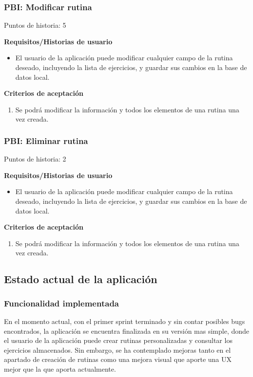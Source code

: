 \documentclass[11pt,a4paper]{report}
\begin{document}
\subsubsection{PBI: Modificar rutina}
Puntos de historia: 5	
\par\textbf{Requisitos/Historias de usuario}
\begin{itemize}
	\item El usuario de la aplicación puede modificar cualquier campo de la rutina deseado, incluyendo la lista de ejercicios, y guardar sus cambios  en la base de datos local.
\end{itemize}
\par\textbf{Criterios de aceptación}
\begin{enumerate}
	\item Se podrá modificar la información y todos los elementos de una rutina una vez creada.
\end{enumerate}
\subsubsection{PBI: Eliminar rutina} 
Puntos de historia: 2
\par\textbf{Requisitos/Historias de usuario}
\begin{itemize}
	\item El usuario de la aplicación puede modificar cualquier campo de la rutina deseado, incluyendo la lista de ejercicios, y guardar sus cambios  en la base de datos local.
\end{itemize}
\par\textbf{Criterios de aceptación}
\begin{enumerate}
	\item Se podrá modificar la información y todos los elementos de una rutina una vez creada.
\end{enumerate}
\subsection{Estado actual de la aplicación}
\subsubsection{Funcionalidad implementada}
En el momento actual, con el primer sprint terminado y sin contar posibles bugs encontrados, la aplicación se encuentra finalizada en su versión mas simple, donde el usuario de la aplicación puede crear rutinas personalizadas y consultar los ejercicios almacenados. Sin embargo, se ha contemplado mejoras tanto en el apartado de creación de rutinas como una mejora visual que aporte una UX mejor que la que aporta actualmente.
\end{document}
